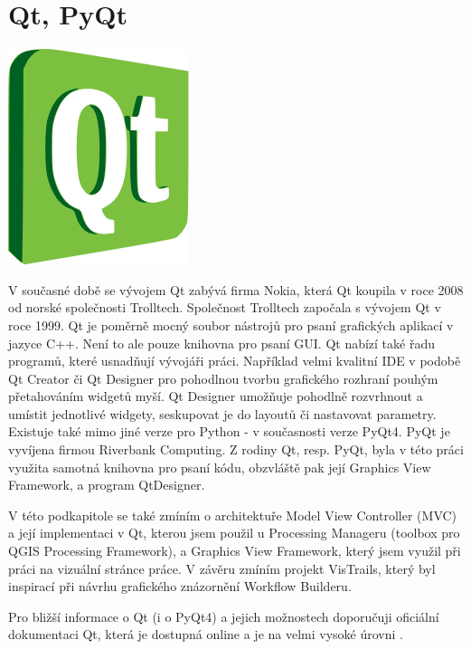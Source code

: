 \newpage
\section{Qt, PyQt}
\nocite{pyqt:www}

\begin{center}
	\includegraphics[scale=0.3]{pictures/qt_logo}
\end{center}

V současné době se vývojem Qt zabývá firma Nokia, která Qt koupila v
roce 2008 od norské společnosti Trolltech. Společnost Trolltech
započala s vývojem Qt v roce 1999. Qt je poměrně mocný soubor nástrojů
pro psaní grafických aplikací v jazyce C++. Není to ale pouze knihovna
pro psaní GUI. Qt nabízí také řadu programů, které usnadňují vývojáři
práci. Například velmi kvalitní IDE v podobě Qt Creator či Qt Designer
pro pohodlnou tvorbu grafického rozhraní pouhým přetahováním widgetů
myší. Qt Designer umožňuje pohodlně rozvrhnout a umístit jednotlivé
widgety, seskupovat je do layoutů či nastavovat parametry. \\

\indent Existuje také mimo jiné verze pro Python - v současnosti verze PyQt4. PyQt je vyvíjena firmou Riverbank Computing. Z rodiny Qt, resp. PyQt, byla v této práci využita samotná knihovna pro psaní kódu, obzvláště pak její Graphics View Framework, a program QtDesigner.

V této podkapitole se také zmíním o architektuře Model View Controller
(MVC) a její implementaci v Qt, kterou jsem použil u Processing
Manageru (toolbox pro QGIS Processing Framework), a Graphics View
Framework, který jsem využil při práci na vizuální stránce práce. V
závěru zmíním projekt VisTrails, který byl inspirací při návrhu
grafického znázornění Workflow Builderu.

Pro bližší informace o Qt (i o PyQt4) a jejich možnostech doporučuji
oficiální dokumentaci Qt, která je dostupná online a je na velmi
vysoké úrovni \cite{qt:www}.

